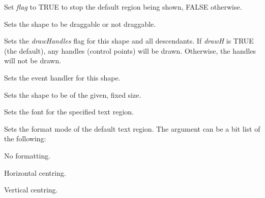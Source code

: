 

Set {\it flag} to TRUE to stop the default region being shown, FALSE otherwise.



Sets the shape to be draggable or not draggable.



Sets the {\it drawHandles} flag for this shape and all descendants. If {\it drawH} is TRUE (the default),
any handles (control points) will be drawn. Otherwise, the handles will not be drawn.



Sets the event handler for this shape.



Sets the shape to be of the given, fixed size.



Sets the font for the specified text region.

\label{setformatmode}


Sets the format mode of the default text region. The argument can be a bit list
of the following:

\begin{description}\itemsep=0pt
\item[FORMAT\_NONE] No formatting.
\item[FORMAT\_CENTRE\_HORIZ] Horizontal centring.
\item[FORMAT\_CENTRE\_VERT] Vertical centring.
\end{description}


